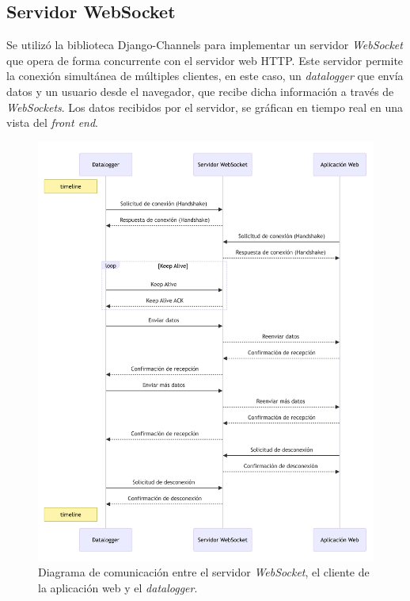 \subsection{Servidor WebSocket}

Se utilizó la biblioteca Django-Channels para implementar un servidor \textit{WebSocket} que opera de forma concurrente con el servidor web HTTP. Este servidor permite la conexión simultánea de múltiples clientes, en este caso, un \textit{datalogger} que envía datos y un usuario desde el navegador, que recibe dicha información a través de \textit{WebSockets}. Los datos recibidos por el servidor, se gráfican en tiempo real en una vista del \textit{front end}. 

\begin{figure}[H]
    \centering
    \includegraphics[width=1\linewidth]{Figuras/AplicacionWeb/backend/TimeLineWebSocket.jpg}
    \caption{Diagrama de comunicación entre el servidor \textit{WebSocket}, el cliente de la aplicación web y el \textit{datalogger}.}
    \label{fig:TimeLineWebSocket}
\end{figure}

